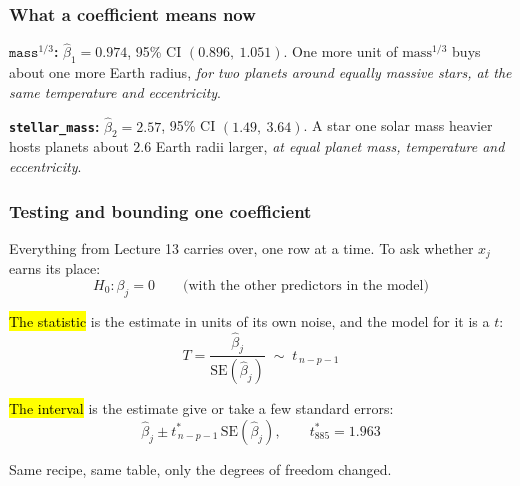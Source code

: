 \documentclass[slidestop,compress,mathserif]{beamer}
\begin{document}
\begin{frame}
\frametitle{What a coefficient means now}


\pause
\vspace{0.4em}
{\small
\textbf{$\texttt{mass}^{1/3}$:} $\hat\beta_1 = 0.974$, 95\% CI $(0.896,\ 1.051)$. One more unit of $\text{mass}^{1/3}$ buys about one more Earth radius, \emph{for two planets around equally massive stars, at the same temperature and eccentricity}.

\smallskip
\textbf{\texttt{stellar\_mass}:} $\hat\beta_2 = 2.57$, 95\% CI $(1.49,\ 3.64)$. A star one solar mass heavier hosts planets about $2.6$ Earth radii larger, \emph{at equal planet mass, temperature and eccentricity}.}

\end{frame}


\begin{frame}
\frametitle{Testing and bounding one coefficient}

Everything from Lecture 13 carries over, one row at a time. To ask whether $x_j$ earns its place:
$$H_0: \beta_j = 0 \qquad\text{(with the other predictors in the model)}$$

\pause
\vspace{0.3em}
\hl{The statistic} is the estimate in units of its own noise, and the model for it is a $t$:
$$T = \frac{\hat\beta_j}{\mathrm{SE}(\hat\beta_j)} \;\sim\; t_{\,n-p-1}$$

\pause
\vspace{0.3em}
\hl{The interval} is the estimate give or take a few standard errors:
$$\hat\beta_j \pm t^\ast_{\,n-p-1}\,\mathrm{SE}(\hat\beta_j), \qquad t^\ast_{885} = 1.963$$

\pause
\vspace{0.2em}
{\small Same recipe, same table, only the degrees of freedom changed.}

\end{frame}
\end{document}

